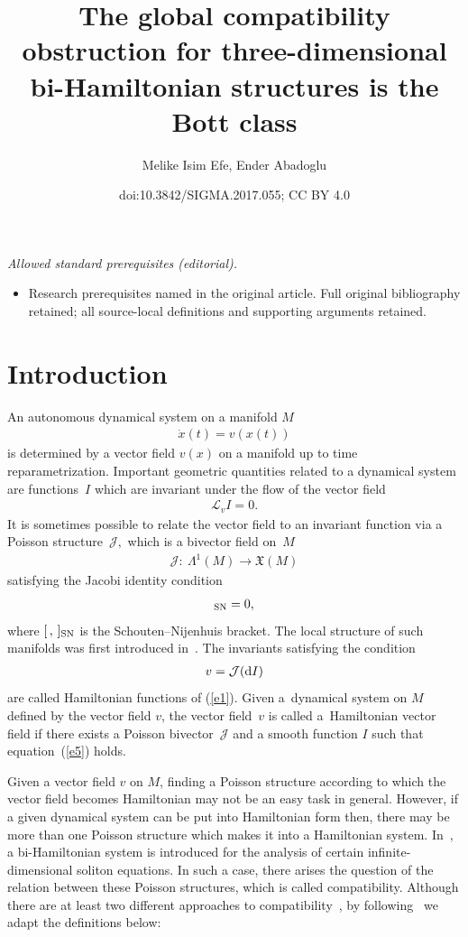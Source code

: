 \documentclass[10pt,a4paper]{amsart}
\title{The global compatibility obstruction for three-dimensional bi-Hamiltonian structures is the Bott class}
\author{Melike Isim Efe, Ender Abadoglu}
\date{doi:10.3842/SIGMA.2017.055; CC BY 4.0}
\numberwithin{equation}{section}
\begin{document}
\maketitle
\noindent\textit{Allowed standard prerequisites (editorial).}\begin{itemize}
\item Research prerequisites named in the original article. Full original bibliography retained; all source-local definitions and supporting arguments retained.
\end{itemize}\medskip
\section{Introduction}

An autonomous dynamical system on a manifold $M$
\begin{gather}
\dot{x}(t) =v(x(t))\label{e1}
\end{gather}
is determined by a vector f\/ield $v(x) $ on a manifold up to time reparametrization. Important geometric quantities related to a dynamical system are functions~$I$ which are invariant under the f\/low of the vector f\/ield
\begin{gather*}
\mathcal{L}_{v}I=0.
\end{gather*}
It is sometimes possible to relate the vector f\/ield to an invariant function via a Poisson structure~$\mathcal{J},$ which is a bivector f\/ield on~$M$
\begin{gather*}
\mathcal{J}\colon \ \Lambda ^{1}(M)\rightarrow \mathfrak{X}(M)
\end{gather*}
satisfying the Jacobi identity condition
\begin{gather*}
 [ \mathcal{J},\mathcal{J} ] _{\rm SN}=0,
\end{gather*}
where $[\, ,\,] _{\rm SN}$ is the Schouten--Nijenhuis bracket. The local structure of such manifolds was f\/irst introduced in~\cite{Wein}. The invariants satisfying the condition
\begin{gather}
v=\mathcal{J}({\rm d}I) \label{e5}
\end{gather}
are called Hamiltonian functions of (\ref{e1}). Given a~dynamical system on $M$ def\/ined by the vector f\/ield $v$, the vector f\/ield~$v$ is called a~Hamiltonian vector f\/ield if there exists a Poisson bivector~$\mathcal{J}$ and a smooth function $I$ such that equation~(\ref{e5}) holds.

 Given a vector f\/ield $v$ on $M$, f\/inding a Poisson structure according to which the vector f\/ield becomes Hamiltonian may not be an easy task in general. However, if a given dynamical system can be put into Hamiltonian form then, there may be more than one Poisson structure which makes it into a Hamiltonian system. In~\cite{Magri}, a bi-Hamiltonian system is introduced for the analysis of certain inf\/inite-dimensional soliton equations. In such a case, there arises the question of the relation between these Poisson structures, which is called compatibility. Although there are at least two dif\/ferent approaches to compatibility~\cite{Santo}, by following~\cite{Olver} we adapt the def\/initions below:
\end{document}
